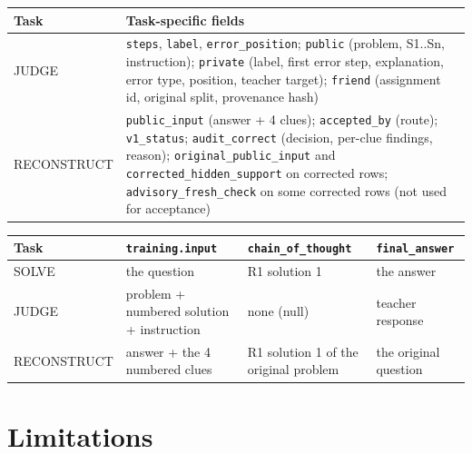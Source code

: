 \documentclass[11pt,a4paper]{article}
\newcommand{\code}[1]{\texttt{#1}}
\begin{document}
\begin{table}[H]
\centering\small
\begin{tabularx}{\textwidth}{@{}p{2.6cm}L@{}}
\toprule
Task & Task-specific fields \\
\midrule
JUDGE & \code{steps}, \code{label}, \code{error\_position}; \code{public} (problem, S1..Sn, instruction); \code{private} (label, first error step, explanation, error type, position, teacher target); \code{friend} (assignment id, original split, provenance hash) \\
RECONSTRUCT & \code{public\_input} (answer + 4 clues); \code{accepted\_by} (route); \code{v1\_status}; \code{audit\_correct} (decision, per-clue findings, reason); \code{original\_public\_input} and \code{corrected\_hidden\_support} on corrected rows; \code{advisory\_fresh\_check} on some corrected rows (not used for acceptance) \\
\bottomrule
\end{tabularx}
\end{table}

\begin{table}[H]
\centering\small
\begin{tabularx}{\textwidth}{@{}lLLL@{}}
\toprule
Task & \code{training.input} & \code{chain\_of\_thought} & \code{final\_answer} \\
\midrule
SOLVE & the question & R1 solution 1 & the answer \\
JUDGE & problem + numbered solution + instruction & none (null) & teacher response \\
RECONSTRUCT & answer + the 4 numbered clues & R1 solution 1 of the original problem & the original question \\
\bottomrule
\end{tabularx}
\end{table}

\section{Limitations}
\end{document}
